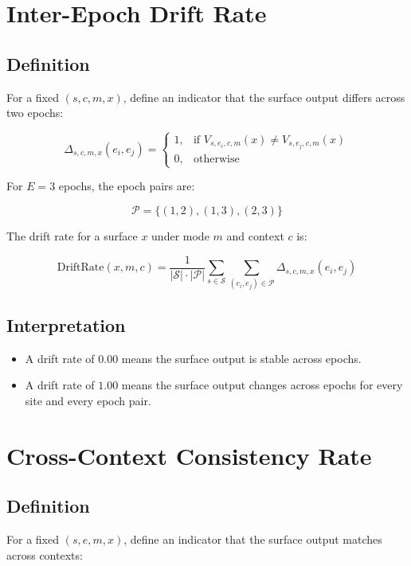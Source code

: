 \documentclass[11pt]{report}
\begin{document}
\section{Inter-Epoch Drift Rate}

\subsection{Definition}

For a fixed $(s,c,m,x)$, define an indicator that the surface output differs across two epochs:

\[
\Delta_{s,c,m,x}(e_i,e_j) =
\begin{cases}
1, & \text{if } V_{s,e_i,c,m}(x) \neq V_{s,e_j,c,m}(x) \\
0, & \text{otherwise}
\end{cases}
\]

For $E=3$ epochs, the epoch pairs are:

\[
\mathcal{P} = \{(1,2), (1,3), (2,3)\}
\]

The drift rate for a surface $x$ under mode $m$ and context $c$ is:

\[
\text{DriftRate}(x,m,c) =
\frac{1}{|\mathcal{S}| \cdot |\mathcal{P}|}
\sum_{s \in \mathcal{S}} \sum_{(e_i,e_j)\in\mathcal{P}}
\Delta_{s,c,m,x}(e_i,e_j)
\]

\subsection{Interpretation}

\begin{itemize}
    \item A drift rate of $0.00$ means the surface output is stable across epochs.
    \item A drift rate of $1.00$ means the surface output changes across epochs for every site and every epoch pair.
\end{itemize}

\section{Cross-Context Consistency Rate}

\subsection{Definition}

For a fixed $(s,e,m,x)$, define an indicator that the surface output matches across contexts:
\end{document}
